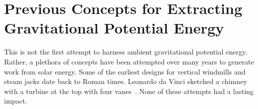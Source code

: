 


\section{Previous Concepts for Extracting Gravitational Potential
 Energy}

%
%

This is not the first attempt to harness ambient gravitational potential
energy. Rather, a plethora of concepts have been attempted over many
years to generate work from solar energy. 
%
%
%
Some of the earliest designs for vertical windmills and steam jacks date
back to Roman times\cite{hills1996power}. Leonardo da Vinci sketched a
chimney with a turbine at the top with four
vanes~\cite{lugt1983vortex}. None of these attempts had a lasting impact. 

% 

